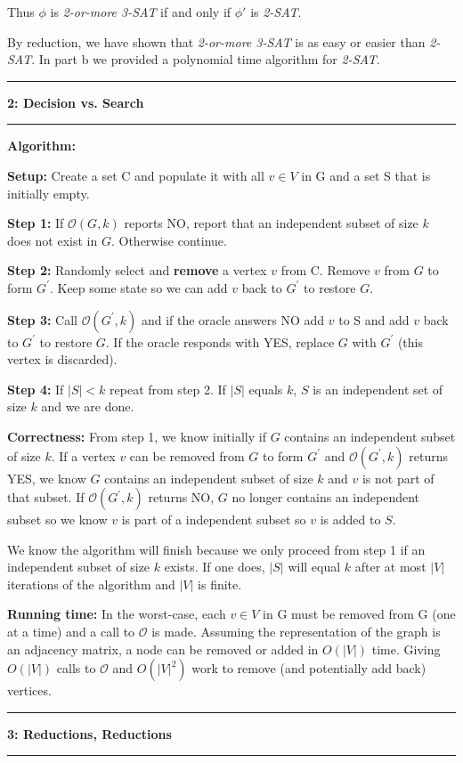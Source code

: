 \documentclass[11pt]{article}
\newcommand\question[2]{\vspace{.25in}\hrule\textbf{#1: #2}\vspace{.5em}\hrule\vspace{.10in}}
\newcommand\algorith{\vspace{.10in}\textbf{Algorithm: }}
\newcommand\correctness{\vspace{.10in}\textbf{Correctness: }}
\newcommand\runtime{\vspace{.10in}\textbf{Running time: }}
\begin{document}
Thus $\phi$ is \textit{2-or-more 3-SAT} if and only if $\phi\prime$ is \textit{2-SAT}.

By reduction, we have shown that \textit{2-or-more 3-SAT} is as easy or easier than \textit{2-SAT}. In part b we provided a polynomial time algorithm for \textit{2-SAT}.

\question{2}{Decision vs. Search}

\algorith 

\textbf{Setup:} Create a set C and populate it with all $v \in V$ in G and a set S that is initially empty. 

\textbf{Step 1:} If $\mathcal{O}(G, k)$ reports NO, report that an independent subset of size $k$ does not exist in $G$. Otherwise continue.

\textbf{Step 2:} Randomly select and \textbf{remove} a vertex $v$ from C. Remove $v$ from $G$ to form $G^\prime$. Keep some state so we can add $v$ back to $G^\prime$ to restore $G$.

\textbf{Step 3:} Call $\mathcal{O}(G^\prime, k)$ and if the oracle answers NO add $v$ to S and add $v$ back to $G^\prime$ to restore $G$. If the oracle responds with YES, replace $G$ with $G^\prime$ (this vertex is discarded).

\textbf{Step 4:} If $|S| < k$ repeat from step 2. If $|S|$ equals $k$, $S$ is an independent set of size $k$ and we are done.

\correctness From step 1, we know initially if $G$ contains an independent subset of size $k$. If a vertex $v$ can be removed from $G$ to form $G^\prime$ and $\mathcal{O}(G^\prime, k)$ returns YES, we know $G$ contains an independent subset of size $k$ and $v$ is not part of that subset. If $\mathcal{O}(G^\prime, k)$ returns NO, $G$ no longer contains an independent subset so we know $v$ is part of a independent subset so $v$ is added to $S$.

	We know the algorithm will finish because we only proceed from step 1 if an independent subset of size $k$ exists. If one does, $|S|$ will equal $k$ after at most $|V|$ iterations of the algorithm and $|V|$ is finite.

\runtime In the worst-case, each $v \in V$ in G must be removed from G (one at a time) and a call to $\mathcal{O}$ is made. Assuming the representation of the graph is an adjacency matrix, a node can be removed or added in $O(|V|)$ time. Giving $O(|V|)$ calls to $\mathcal{O}$ and $O(|V|^2)$ work to remove (and potentially add back) vertices.

\question{3}{Reductions, Reductions}
\end{document}
